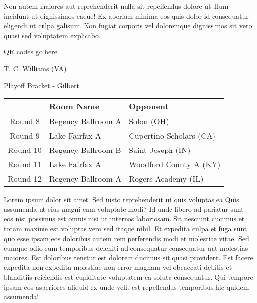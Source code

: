 \documentclass{article}%
\begin{document}
\newline%
Non autem maiores aut reprehenderit nulla sit repellendus dolore ut illum incidunt ut dignissimos eaque! Ex aperiam minima eos quis dolor id consequatur eligendi ut culpa galisum. Non fugiat corporis vel doloremque dignissimos sit vero quasi sed voluptatem explicabo.\newline%
\newline%
%
\vspace*{30pt}%
\begin{center}%
\begin{Huge}%
QR codes go here%
\end{Huge}%
\end{center}%
\newpage%
\begin{center}%
\begin{Huge}%
T. C. Williams (VA)%
\end{Huge}%
\vspace*{8pt}%
\linebreak%
\begin{Large}%
Playoff Bracket {-} Gilbert%
\end{Large}%
\end{center}%
\begin{tabularx}{\textwidth}{|c|Y|Y|}%
\hline%
&Room Name&Opponent\\%
\hline%
Round 8&Regency Ballroom A&Solon (OH)\\%
Round 9&Lake Fairfax A&Cupertino Scholars (CA)\\%
Round 10&Regency Ballroom B&Saint Joseph (IN)\\%
Round 11&Lake Fairfax A&Woodford County A (KY)\\%
Round 12&Regency Ballroom A&Rogers Academy (IL)\\%
\hline%
\end{tabularx}%
\vspace*{8pt}%
\linebreak%
\newline%
\newline%
Lorem ipsum dolor sit amet. Sed iusto reprehenderit ut quis voluptas ea Quis assumenda ut eius magni eum voluptate modi? Id unde libero ad pariatur sunt eos nisi possimus est omnis nisi ut internos laboriosam. Sit nesciunt ducimus et totam maxime est voluptas vero sed itaque nihil. Et expedita culpa et fuga sunt quo esse ipsam eos doloribus autem rem perferendis modi et molestiae vitae.\newline%
\newline%
Sed cumque odio eum temporibus deleniti ad consequatur consequatur aut molestias maiores. Est doloribus tenetur est dolorem ducimus sit quasi provident. Est facere expedita non expedita molestiae non error magnam vel obcaecati debitis et blanditiis reiciendis est cupiditate voluptatem ea soluta consequatur. Qui tempore ipsam eos asperiores aliquid ex unde velit est repellendus temporibus hic quidem assumenda!\newline%
\end{document}

